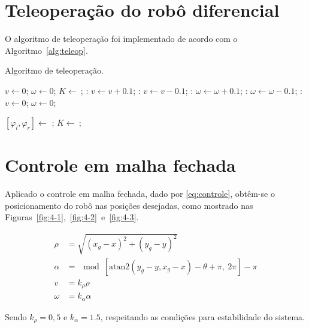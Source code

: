 \section{Teleoperação do robô diferencial}

O algoritmo de teleoperação foi implementado de acordo com  o Algoritmo~\autoref{alg:teleop}.
\begin{algorithm}
	\caption{Algoritmo de teleoperação.}\label{alg:teleop}
	\begin{algorithmic}[1]
		\State $v \gets 0$;
		\State $\omega \gets 0$;
		\State $K \gets  \ $;
				:
				\State $v \gets v+0.1$;
				\EndCase
				:
				 \State $v \gets v-0.1$;
				\EndCase
				:
				\State $\omega \gets \omega+0.1$;
				\EndCase
				:
				\State $\omega \gets \omega-0.1$;
				\EndCase
				:
				\State $v \gets 0$;
				\State $\omega \gets 0$;
				\EndCase
			\EndSwitch
			
			\State $[\varphi_l, \varphi_r] \gets $ ;
			\State  {}
			\State $K \gets  \ $;
			
		\EndWhile
	\end{algorithmic}
\end{algorithm}




\section{Controle em malha fechada}


Aplicado o controle em malha fechada, dado por \eqref{eq:controle}, obtêm-se o posicionamento do robô nas posições desejadas, como mostrado nas Figuras~\ref{fig:4-1},~\ref{fig:4-2}~e~\ref{fig:4-3}.

\begin{equation}\label{eq:controle}
	\begin{split}
		\rho &= \sqrt{(x_g-x)^2 + (y_g-y)^2} \\
		\alpha& = \mod \left[\text{atan2}\left(y_g-y,x_g-x\right) - \theta + \pi, \ 2\pi \right] -\pi \\
		v &= k_\rho\rho \\
		\omega &= k_\alpha\alpha
	\end{split}
\end{equation}

Sendo $k_\rho = 0,5$ e $k_\alpha = 1.5$, respeitando as condições para estabilidade do sistema.


